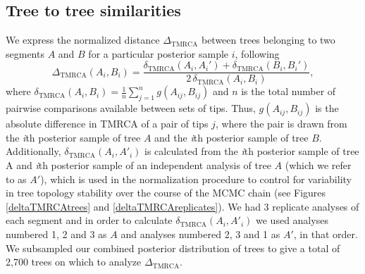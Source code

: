 \documentclass[11pt,oneside,letterpaper]{article}
\newcommand{\dtmrca}{\Delta_\mathrm{TMRCA}}
\newcommand{\undtmrca}{\delta_\mathrm{TMRCA}}
\begin{document}
\subsection*{Tree to tree similarities}
We express the normalized distance $\dtmrca$ between trees belonging to two segments $A$ and $B$ for a particular posterior sample $i$, following
\begin{equation}
\dtmrca(A_i, B_i) = \frac{\undtmrca(A_i, A_i') + \undtmrca(B_i, B_i')}{2 \, \undtmrca(A_i, B_i)},
\end{equation}
where $\undtmrca(A_i, B_i) = \frac{1}{n}\sum_{j=1}^n g(A_{ij}, B_{ij})$ and $n$ is the total number of pairwise comparisons available between sets of tips.
Thus, $g(A_{ij},B_{ij})$ is the absolute difference in TMRCA of a pair of tips $j$, where the pair is drawn from the \textit{i}th posterior sample of tree $A$ and the \textit{i}th posterior sample of tree $B$.
Additionally, $\undtmrca(A_i,A'_i)$ is calculated from the \textit{i}th posterior sample of tree A and \textit{i}th posterior sample of an independent analysis of tree $A$ (which we refer to as $A'$), which is used in the normalization procedure to control for variability in tree topology stability over the course of the MCMC chain (see Figures \ref{deltaTMRCAtrees} and \ref{deltaTMRCAreplicates}).
We had 3 replicate analyses of each segment and in order to calculate $\undtmrca(A_i,A'_i)$ we used analyses numbered 1, 2 and 3 as $A$ and analyses numbered 2, 3 and 1 as $A'$, in that order.
We subsampled our combined posterior distribution of trees to give a total of 2,700 trees on which to analyze $\dtmrca$.
\end{document}
